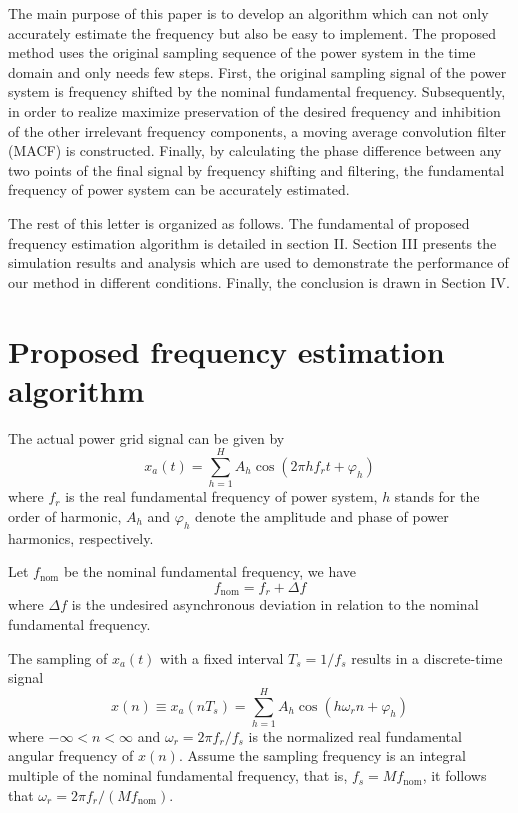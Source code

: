 \documentclass[journal,twoside]{IEEEtran}
\begin{document}
The main purpose of this paper is to develop an algorithm which can not only accurately estimate the frequency but also be easy to implement. The proposed method uses the original sampling sequence of the power system in the time domain and only needs few steps. First, the original sampling signal of the power system is frequency shifted by the nominal fundamental frequency. Subsequently, in order to realize maximize preservation of the desired frequency and inhibition of the other irrelevant frequency components, a moving average convolution filter (MACF) is constructed. Finally, by calculating the phase difference between any two points of the final signal by frequency shifting and filtering, the fundamental frequency of power system can be accurately estimated.

The rest of this letter is organized as follows. The fundamental of proposed frequency estimation algorithm is detailed in section II. Section III presents the simulation results and analysis which are used to demonstrate the performance of our method in different conditions. Finally, the conclusion is drawn in Section IV.
\section{Proposed frequency estimation algorithm}
The actual power grid signal can be given by
\begin{equation}
x_a(t)=\sum_{h=1}^{H}A_h\cos(2\pi hf_rt+\varphi_h)\label{eqn_1}
\end{equation}
where $f_r$ is the real fundamental frequency of power system, $h$ stands for the order of harmonic, $A_h$ and $\varphi_h$ denote the amplitude and phase of power harmonics, respectively.

Let $f_\mathrm{nom}$ be the nominal fundamental frequency, we have
\begin{equation}
f_\mathrm{nom}=f_r+\Delta f\label{eqn_2}
\end{equation}
where $\Delta f$ is the undesired asynchronous deviation in relation to the nominal fundamental frequency.

The sampling of $x_a(t)$ with a fixed interval $T_s=1/f_s$ results in a discrete-time signal
\begin{equation}
x(n)\equiv x_a(nT_s)=\sum_{h=1}^{H}A_h\cos (h\omega_r n+\varphi_h)\label{eqn_3}
\end{equation}
where $-\infty<n<\infty$ and $\omega_r=2\pi f_r/f_s$ is the normalized real fundamental angular frequency of $x(n)$. Assume the sampling frequency is an integral multiple of the nominal fundamental frequency, that is, $f_s=Mf_\mathrm{nom}$, it follows that $\omega_r=2\pi f_r/(Mf_\mathrm{nom})$.
\end{document}
